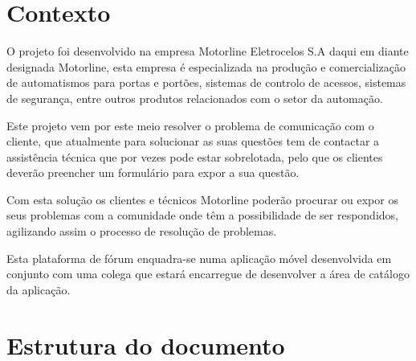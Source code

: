 

\section{Contexto}
O projeto foi desenvolvido na empresa Motorline Eletrocelos S.A daqui em diante designada Motorline, 
esta empresa é especializada na produção e comercialização de automatismos para portas e portões, 
sistemas de controlo de acessos, sistemas de segurança, entre outros produtos relacionados com o setor 
da automação.

Este projeto vem por este meio resolver o problema de comunicação com o cliente, que atualmente para 
solucionar as suas questões tem de contactar a assistência técnica que por vezes pode estar sobrelotada, 
pelo que os clientes deverão preencher um formulário para expor a sua questão.

Com esta solução os clientes e técnicos Motorline poderão procurar ou expor os seus problemas com a 
comunidade onde têm a possibilidade de ser respondidos, agilizando assim o processo de resolução de problemas.

Esta plataforma de fórum enquadra-se numa aplicação móvel desenvolvida em conjunto com uma 
colega que estará encarregue de desenvolver a área de catálogo da aplicação.

\newpage
\section{Estrutura do documento}


